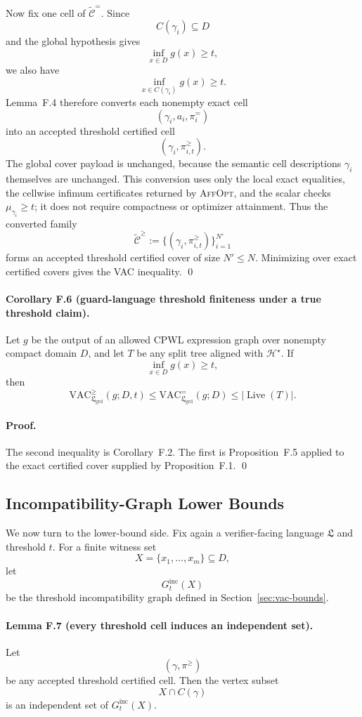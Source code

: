 Now fix one cell of $\widetilde{\mathcal C}^{=}$. Since
\[
C(\gamma_i)\subseteq D
\]
and the global hypothesis gives
\[
\inf_{x\in D}g(x)\ge t,
\]
we also have
\[
\inf_{x\in C(\gamma_i)}g(x)\ge t.
\]
Lemma~F.4 therefore converts each nonempty exact cell
\[
(\gamma_i,a_i,\pi_i^{=})
\]
into an accepted threshold certified cell
\[
(\gamma_i,\pi_{i,t}^{\ge}).
\]
The global cover payload is unchanged, because the semantic cell descriptions $\gamma_i$ themselves are unchanged. This conversion uses only the local exact equalities, the cellwise infimum certificates returned by \textsc{AffOpt}, and the scalar checks $\mu_{\gamma_i}\ge t$; it does not require compactness or optimizer attainment. Thus the converted family
\[
\widetilde{\mathcal C}^{\ge}
:=
\{(\gamma_i,\pi_{i,t}^{\ge})\}_{i=1}^{N'}
\]
forms an accepted threshold certified cover of size $N'\le N$. Minimizing over exact certified covers gives the VAC inequality. \qed

\paragraph{Corollary F.6 (guard-language threshold finiteness under a true threshold claim).}
Let $g$ be the output of an allowed CPWL expression graph over nonempty compact domain $D$, and let $T$ be any split tree aligned with $\mathcal H^\star$. If
\[
\inf_{x\in D}g(x)\ge t,
\]
then
\[
\mathrm{VAC}^{\ge}_{\mathfrak L_{\mathrm{grd}}}(g;D,t)
\le
\mathrm{VAC}^{=}_{\mathfrak L_{\mathrm{grd}}}(g;D)
\le
|\operatorname{Live}(T)|.
\]

\paragraph{Proof.}
The second inequality is Corollary~F.2. The first is Proposition~F.5 applied to the exact certified cover supplied by Proposition~F.1. \qed

\subsection{Incompatibility-Graph Lower Bounds}

We now turn to the lower-bound side. Fix again a verifier-facing language $\mathfrak L$ and threshold $t$. For a finite witness set
\[
X=\{x_1,\dots,x_m\}\subseteq D,
\]
let
\[
G_t^{\mathrm{inc}}(X)
\]
be the threshold incompatibility graph defined in Section~\ref{sec:vac-bounds}.

\paragraph{Lemma F.7 (every threshold cell induces an independent set).}
Let
\[
(\gamma,\pi^{\ge})
\]
be any accepted threshold certified cell. Then the vertex subset
\[
X\cap C(\gamma)
\]
is an independent set of $G_t^{\mathrm{inc}}(X)$.

